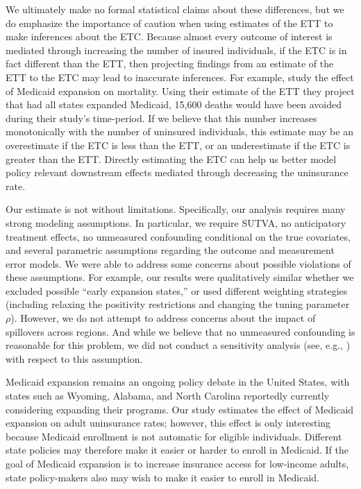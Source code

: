 \documentclass[aoas]{imsart}
\theoremstyle{plain}
\theoremstyle{remark}
\begin{document}
We ultimately make no formal statistical claims about these differences, but we do emphasize the importance of caution when using estimates of the ETT to make inferences about the ETC. Because almost every outcome of interest is mediated through increasing the number of insured individuals, if the ETC is in fact different than the ETT, then projecting findings from an estimate of the ETT to the ETC may lead to inaccurate inferences. For example, \cite{miller2019medicaid} study the effect of Medicaid expansion on mortality. Using their estimate of the ETT they project that had all states expanded Medicaid, 15,600 deaths would have been avoided during their study's time-period. If we believe that this number increases monotonically with the number of uninsured individuals, this estimate may be an overestimate if the ETC is less than the ETT, or an underestimate if the ETC is greater than the ETT. Directly estimating the ETC can help us better model policy relevant downstream effects mediated through decreasing the uninsurance rate. 

Our estimate is not without limitations. Specifically, our analysis requires many strong modeling assumptions. In particular, we require SUTVA, no anticipatory treatment effects, no unmeasured confounding conditional on the true covariates, and several parametric assumptions regarding the outcome and measurement error models. We were able to address some concerns about possible violations of these assumptions. For example, our results were qualitatively similar whether we excluded possible ``early expansion states,'' or used different weighting strategies (including relaxing the positivity restrictions and changing the tuning parameter $\rho$). However, we do not attempt to address concerns about the impact of spillovers across regions. And while we believe that no unmeasured confounding is reasonable for this problem, we did not conduct a sensitivity analysis (see, e.g., \cite{bonvini2021sensitivity}) with respect to this assumption. 

Medicaid expansion remains an ongoing policy debate in the United States, with states such as Wyoming, Alabama, and North Carolina reportedly currently considering expanding their programs. Our study estimates the effect of Medicaid expansion on adult uninsurance rates; however, this effect is only interesting because Medicaid enrollment is not automatic for eligible individuals. Different state policies may therefore make it easier or harder to enroll in Medicaid. If the goal of Medicaid expansion is to increase insurance access for low-income adults, state policy-makers also may wish to make it easier to enroll in Medicaid. 
\end{document}
